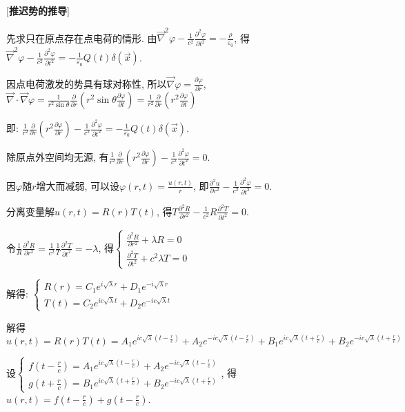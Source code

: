 [\textbf{推迟势的推导}]\par
\qquad 先求只在原点存在点电荷的情形. 由$\vec\nabla^2\varphi-\frac{1}{c^2}\frac{\partial^2\varphi}{\partial t^2}=-\frac{\rho}{\varepsilon_0}$, 得$\vec\nabla^2\varphi-\frac{1}{c^2}\frac{\partial^2\varphi}{\partial t^2}=-\frac{1}{\varepsilon_0}Q(t)\delta(\vec x)$.\par
\qquad 因点电荷激发的势具有球对称性, 所以$\vec\nabla\varphi=\frac{\partial \varphi}{\partial r}$, $\vec\nabla\cdot\vec\nabla\varphi=\frac{1}{r^2\sin\theta}\frac{\partial}{\partial r}\left(r^2\sin\theta\frac{\partial\varphi}{\partial t}\right)=\frac{1}{r^2}\frac{\partial}{\partial r}\left(r^2\frac{\partial\varphi}{\partial t}\right)$\par
\qquad \quad 即: $\frac{1}{r^2}\frac{\partial}{\partial r}\left(r^2\frac{\partial\varphi}{\partial r}\right)-\frac{1}{c^2}\frac{\partial^2\varphi}{\partial t^2}=-\frac{1}{\varepsilon_0}Q(t)\delta(\vec x)$.\par
\qquad 除原点外空间均无源, 有$\frac{1}{r^2}\frac{\partial}{\partial r}\left(r^2\frac{\partial\varphi}{\partial r}\right)-\frac{1}{c^2}\frac{\partial^2\varphi}{\partial t^2}=0$.\par
\qquad 因$\varphi$随$r$增大而减弱, 可以设$\varphi(r,t)=\frac{u(r,t)}{r}$, 即$\frac{\partial^2u}{\partial r^2}-\frac{1}{c^2}\frac{\partial^2\varphi}{\partial t^2}=0$.\par
\quad 分离变量解$u(r,t)=R(r)T(t)$, 得$T\frac{\partial^2R}{\partial r^2}-\frac{1}{c^2}R\frac{\partial^2T}{\partial t^2}=0$.\par
\qquad \quad 令$\frac{1}{R}\frac{\partial^2R}{\partial r^2}=\frac{1}{c^2}\frac{1}{T}\frac{\partial^2T}{\partial t^2}=-\lambda$, 得$\begin{cases}\frac{\partial^2R}{\partial r^2}+\lambda R=0\\\frac{\partial^2T}{\partial t^2}+c^2\lambda T=0\end{cases}$\par
\qquad \quad \quad 解得: $\begin{cases}R(r)=C_1e^{i\sqrt{\lambda}r}+D_1e^{-i\sqrt{\lambda}r}\\T(t)=C_2e^{ic\sqrt{\lambda}t}+D_2e^{-ic\sqrt{\lambda}t}\end{cases}$\par
\qquad 解得$u(r,t)=R(r)T(t)=A_1e^{ic\sqrt{\lambda}(t-\frac{r}{c})}+A_2e^{-ic\sqrt{\lambda}(t-\frac{r}{c})}+B_1e^{ic\sqrt{\lambda}(t+\frac{r}{c})}+B_2e^{-ic\sqrt{\lambda}(t+\frac{r}{c})}$\par
\qquad \quad 设$\begin{cases}f(t-\frac{r}{c})=A_1e^{ic\sqrt{\lambda}(t-\frac{r}{c})}+A_2e^{-ic\sqrt{\lambda}(t-\frac{r}{c})}\\g(t+\frac{r}{c})=B_1e^{ic\sqrt{\lambda}(t+\frac{r}{c})}+B_2e^{-ic\sqrt{\lambda}(t+\frac{r}{c})}\end{cases}$, 得$u(r,t)=f(t-\frac{r}{c})+g(t-\frac{r}{c})$.\par

